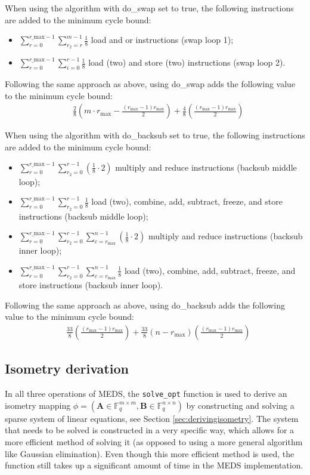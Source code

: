 \documentclass[11pt,a4paper]{report}
\theoremstyle{definition}
\begin{document}
When using the algorithm with do\_swap set to true, the following instructions are added to the minimum cycle bound:
\begin{itemize}
  \item $\sum_{r=0}^{r\_\text{max}-1} \sum_{r_2=r}^{m-1} \frac{1}{8}$ load and or instructions (swap loop 1);
  \item $\sum_{r=0}^{r\_\text{max}-1} \sum_{i=0}^{r-1} \frac{1}{8}$ load (two) and store (two) instructions (swap loop 2).
\end{itemize}
Following the same approach as above, using do\_swap adds the following value to the minimum cycle bound:
\begin{align*}
  & \frac{2}{8} \left( m \cdot r_\text{max} - \frac{(r_\text{max} - 1)r_{\text{max}}}{2} \right) + \frac{4}{8} \left( \frac{(r_\text{max} - 1)r_{\text{max}}}{2} \right)
\end{align*}

When using the algorithm with do\_backsub set to true, the following instructions are added to the minimum cycle bound:
\begin{itemize}
  \item $\sum_{r=0}^{r\_\text{max}-1} \sum_{r_2=0}^{r-1} (\frac{1}{8} \cdot 2)$ multiply and reduce instructions (backsub middle loop);
  \item $\sum_{r=0}^{r\_\text{max}-1} \sum_{r_2=0}^{r-1} \frac{1}{8}$ load (two), combine, add, subtract, freeze, and store instructions (backsub middle loop);
  \item $\sum_{r=0}^{r\_\text{max}-1} \sum_{r_2=0}^{r-1} \sum_{c=r_\text{max}}^{n-1} (\frac{1}{8} \cdot 2)$ multiply and reduce instructions (backsub inner loop);
  \item $\sum_{r=0}^{r\_\text{max}-1} \sum_{r_2=0}^{r-1} \sum_{c=r_\text{max}}^{n-1} \frac{1}{8}$ load (two), combine, add, subtract, freeze, and store instructions (backsub inner loop).
\end{itemize}
Following the same approach as above, using do\_backsub adds the following value to the minimum cycle bound:
\begin{align*}
  & \frac{33}{8} \left( \frac{(r_\text{max} - 1)r_{\text{max}}}{2} \right) + \frac{33}{8} \left( n - r_\text{max} \right) \left( \frac{(r_\text{max} - 1)r_{\text{max}}}{2} \right)
\end{align*}

\subsection{Isometry derivation}
\label{sec:isometryderivation}
In all three operations of MEDS, the \texttt{solve\_opt} function is used to derive an isometry mapping $\phi = (\textbf{A} \in \mathbb{F}_q^{m \times m}, \textbf{B} \in \mathbb{F}_q^{n \times n})$ by constructing and solving a sparse system of linear equations, see Section \ref{sec:derivingisometry}. The system that needs to be solved is constructed in a very specific way, which allows for a more efficient method of solving it (as opposed to using a more general algorithm like Gaussian elimination). Even though this more efficient method is used, the function still takes up a significant amount of time in the MEDS implementation.
\end{document}
